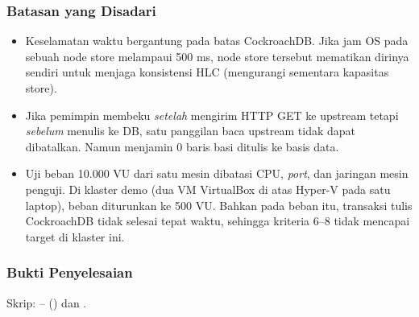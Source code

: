 \subsubsection{Batasan yang Disadari}
\begin{itemize}
\item Keselamatan waktu bergantung pada batas  CockroachDB. Jika jam OS pada sebuah node store melampaui 500 ms, node store tersebut mematikan dirinya sendiri untuk menjaga konsistensi HLC (mengurangi sementara kapasitas store).
\item Jika pemimpin membeku \textit{setelah} mengirim HTTP GET ke upstream tetapi \textit{sebelum} menulis ke DB, satu panggilan baca upstream tidak dapat dibatalkan. Namun  menjamin 0 baris basi ditulis ke basis data.
\item Uji beban 10.000 VU dari satu mesin dibatasi CPU, \textit{port}, dan jaringan mesin penguji. Di klaster demo (dua VM VirtualBox di atas Hyper-V pada satu laptop), beban diturunkan ke 500 VU. Bahkan pada beban itu, transaksi tulis CockroachDB tidak selesai tepat waktu, sehingga kriteria 6--8 tidak mencapai target di klaster ini.
\end{itemize}

\subsubsection{Bukti Penyelesaian}

Skrip: -- () dan .

